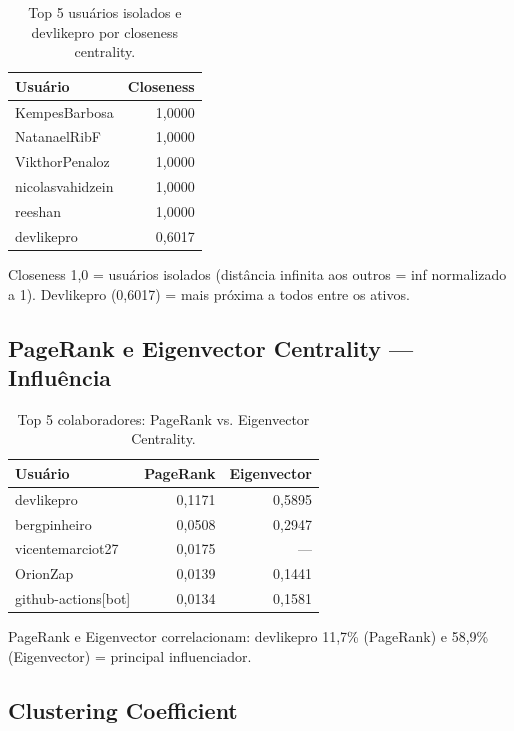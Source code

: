 \documentclass[12pt,a4paper]{article}
\begin{document}
\begin{table}[h]
  \centering
  \caption{Top 5 usuários isolados e devlikepro por closeness centrality.}
  \label{tab:closeness}
  \begin{tabular}{l|r}
    \toprule
    \textbf{Usuário} & \textbf{Closeness} \\
    \midrule
    KempesBarbosa      & 1,0000 \\
    NatanaelRibF       & 1,0000 \\
    VikthorPenaloz     & 1,0000 \\
    nicolasvahidzein   & 1,0000 \\
    reeshan            & 1,0000 \\
    devlikepro         & 0,6017 \\
    \bottomrule
  \end{tabular}
\end{table}

Closeness 1,0 = usuários isolados (distância infinita aos outros = inf normalizado a 1). Devlikepro (0,6017) = mais próxima a todos entre os ativos.

\subsection{PageRank e Eigenvector Centrality — Influência}

\begin{table}[h]
  \centering
  \caption{Top 5 colaboradores: PageRank vs. Eigenvector Centrality.}
  \label{tab:centrality}
  \begin{tabular}{l|r|r}
    \toprule
    \textbf{Usuário} & \textbf{PageRank} & \textbf{Eigenvector} \\
    \midrule
    devlikepro         & 0,1171 & 0,5895 \\
    bergpinheiro       & 0,0508 & 0,2947 \\
    vicentemarciot27   & 0,0175 & — \\
    OrionZap           & 0,0139 & 0,1441 \\
    github-actions[bot] & 0,0134 & 0,1581 \\
    \bottomrule
  \end{tabular}
\end{table}

PageRank e Eigenvector correlacionam: devlikepro 11,7\% (PageRank) e 58,9\% (Eigenvector) = principal influenciador.

\subsection{Clustering Coefficient}
\end{document}
